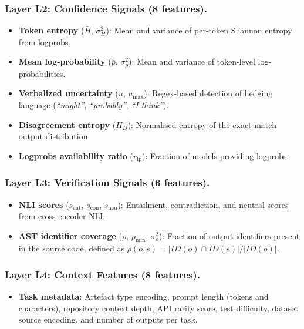 \documentclass[runningheads]{llncs}
\begin{document}
\subsubsection{Layer L2: Confidence Signals (8 features).}
\begin{itemize}
\item \textbf{Token entropy} ($\bar{H}$, $\sigma^2_H$): Mean and variance of per-token Shannon entropy from logprobs.
\item \textbf{Mean log-probability} ($\bar{p}$, $\sigma^2_p$): Mean and variance of token-level log-probabilities.
\item \textbf{Verbalized uncertainty} ($\bar{u}$, $u_\mathrm{max}$): Regex-based detection of hedging language (\textit{``might''}, \textit{``probably''}, \textit{``I think''}).
\item \textbf{Disagreement entropy} ($H_D$): Normalised entropy of the exact-match output distribution.
\item \textbf{Logprobs availability ratio} ($r_\mathrm{lp}$): Fraction of models providing logprobs.
\end{itemize}

\subsubsection{Layer L3: Verification Signals (6 features).}
\begin{itemize}
\item \textbf{NLI scores} ($s_\mathrm{ent}$, $s_\mathrm{con}$, $s_\mathrm{neu}$): Entailment, contradiction, and neutral scores from cross-encoder NLI.
\item \textbf{AST identifier coverage} ($\bar{\rho}$, $\rho_\mathrm{min}$, $\sigma^2_\rho$): Fraction of output identifiers present in the source code, defined as $\rho(o,s) = |ID(o) \cap ID(s)| / |ID(o)|$.
\end{itemize}

\subsubsection{Layer L4: Context Features (8 features).}
\begin{itemize}
\item \textbf{Task metadata}: Artefact type encoding, prompt length (tokens and characters), repository context depth, API rarity score, test difficulty, dataset source encoding, and number of outputs per task.
\end{itemize}
\end{document}

